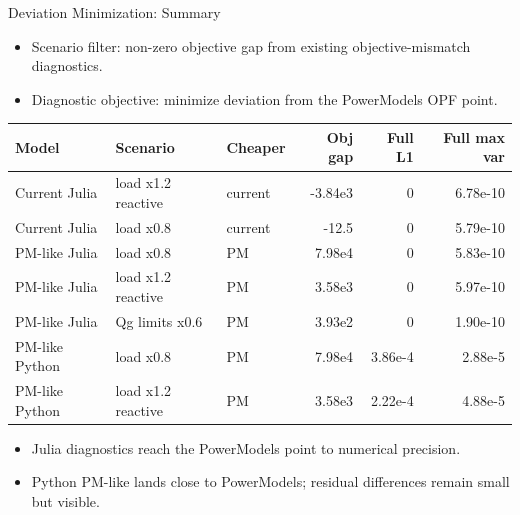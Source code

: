 \begin{frame}{Deviation Minimization: Summary}
\scriptsize
\begin{itemize}
  \item Scenario filter: non-zero objective gap from existing objective-mismatch diagnostics.
  \item Diagnostic objective: minimize deviation from the PowerModels OPF point.
\end{itemize}

\vspace{0.2em}
\begin{tabular}{lllrrr}
\toprule
Model & Scenario & Cheaper & Obj gap & Full L1 & Full max var \\
\midrule
Current Julia & load x1.2 reactive & current & -3.84e3 & 0 & 6.78e-10 \\
Current Julia & load x0.8 & current & -12.5 & 0 & 5.79e-10 \\
PM-like Julia & load x0.8 & PM & 7.98e4 & 0 & 5.83e-10 \\
PM-like Julia & load x1.2 reactive & PM & 3.58e3 & 0 & 5.97e-10 \\
PM-like Julia & Qg limits x0.6 & PM & 3.93e2 & 0 & 1.90e-10 \\
PM-like Python & load x0.8 & PM & 7.98e4 & 3.86e-4 & 2.88e-5 \\
PM-like Python & load x1.2 reactive & PM & 3.58e3 & 2.22e-4 & 4.88e-5 \\
\bottomrule
\end{tabular}

\vspace{0.4em}
\begin{itemize}
  \item Julia diagnostics reach the PowerModels point to numerical precision.
  \item Python PM-like lands close to PowerModels; residual differences remain small but visible.
\end{itemize}

\end{frame}


